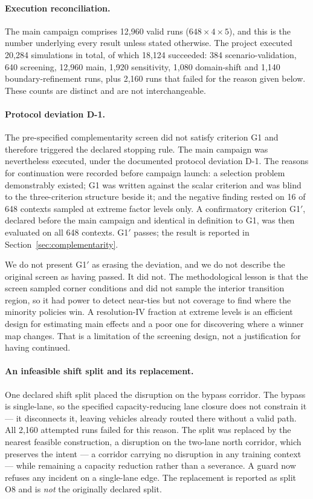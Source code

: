 \documentclass[runningheads]{llncs}
\begin{document}
\paragraph{Execution reconciliation.} The main campaign comprises
12{,}960 valid runs
($648 \times 4 \times 5$), and this is the number
underlying every result unless stated otherwise. The project executed
20{,}284 simulations in total, of which
18{,}124 succeeded: 384 scenario-validation,
640 screening, 12{,}960 main, 1{,}920 sensitivity,
1{,}080 domain-shift and 1{,}140 boundary-refinement runs,
plus 2{,}160 runs that failed for the reason given below. These
counts are distinct and are not interchangeable.

\paragraph{Protocol deviation D-1.} The pre-specified complementarity screen did
not satisfy criterion G1 and therefore triggered the declared stopping rule. The
main campaign was nevertheless executed, under the documented protocol deviation
D-1. The reasons for continuation were recorded before campaign launch: a
selection problem demonstrably existed; G1 was written against the scalar
criterion and was blind to the three-criterion structure beside it; and the
negative finding rested on 16 of 648 contexts sampled at extreme
factor levels only. A confirmatory criterion G1$'$, declared before the main
campaign and identical in definition to G1, was then evaluated on all
648 contexts. G1$'$ passes; the result is reported in
Section~\ref{sec:complementarity}.

We do not present G1$'$ as erasing the deviation, and we do not describe the
original screen as having passed. It did not. The methodological lesson is that
the screen sampled corner conditions and did not sample the interior transition
region, so it had power to detect near-ties but not coverage to find where the
minority policies win. A resolution-IV fraction at extreme levels is an
efficient design for estimating main effects and a poor one for discovering
where a winner map changes. That is a limitation of the screening design, not a
justification for having continued.

\paragraph{An infeasible shift split and its replacement.} One declared shift
split placed the disruption on the bypass corridor. The bypass is single-lane,
so the specified capacity-reducing lane closure does not constrain it --- it
disconnects it, leaving vehicles already routed there without a valid path. All
2{,}160 attempted runs failed for this reason. The split was
replaced by the nearest feasible construction, a disruption on the two-lane
north corridor, which preserves the intent --- a corridor carrying no disruption
in any training context --- while remaining a capacity reduction rather than a
severance. A guard now refuses any incident on a single-lane edge. The
replacement is reported as split O8 and is \emph{not} the originally declared
split.
\end{document}
